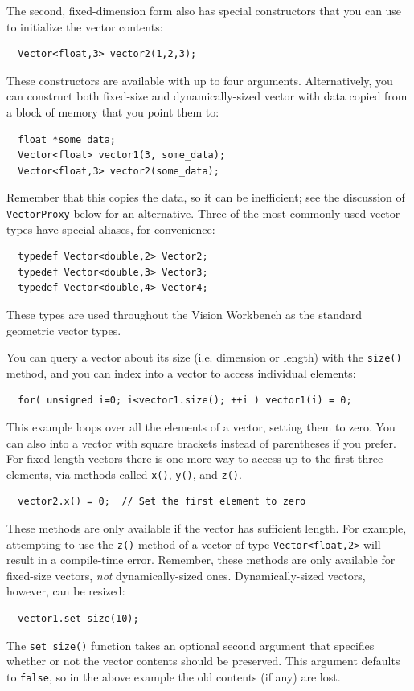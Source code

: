 The second, fixed-dimension form also has special constructors that
you can use to initialize the vector contents:
\begin{verbatim}
  Vector<float,3> vector2(1,2,3);
\end{verbatim}
These constructors are available with up to four arguments.
Alternatively, you can construct both fixed-size and dynamically-sized 
vector with data copied from a block of memory that you point them to:
\begin{verbatim}
  float *some_data;
  Vector<float> vector1(3, some_data);
  Vector<float,3> vector2(some_data);
\end{verbatim}
Remember that this copies the data, so it can be inefficient; see 
the discussion of \verb#VectorProxy# below for an alternative.
Three of the most commonly used vector types have special aliases, 
for convenience:
\begin{verbatim}
  typedef Vector<double,2> Vector2;
  typedef Vector<double,3> Vector3;
  typedef Vector<double,4> Vector4;
\end{verbatim}
These types are used throughout the Vision Workbench as the standard
geometric vector types.

You can query a vector about its size (i.e. dimension or length) with
the \verb#size()# method, and you can index into a vector to access 
individual elements:
\begin{verbatim}
  for( unsigned i=0; i<vector1.size(); ++i ) vector1(i) = 0;
\end{verbatim}
This example loops over all the elements of a vector, setting them 
to zero.  You can also into a vector with square brackets instead 
of parentheses if you prefer.  For fixed-length vectors there is one 
more way to access up to the first three elements, via methods called 
\verb#x()#, \verb#y()#, and \verb#z()#.
\begin{verbatim}
  vector2.x() = 0;  // Set the first element to zero
\end{verbatim}
These methods are only available if the vector has sufficient 
length.  For example, attempting to use the \verb#z()# method of 
a vector of type \verb#Vector<float,2># will result in a compile-time 
error.  Remember, these methods are only available for fixed-size 
vectors, {\it not} dynamically-sized ones.  Dynamically-sized 
vectors, however, can be resized:
\begin{verbatim}
  vector1.set_size(10);
\end{verbatim}
The \verb#set_size()# function takes an optional second argument that 
specifies whether or not the vector contents should be preserved.  
This argument defaults to \verb#false#, so in the above example 
the old contents (if any) are lost.

